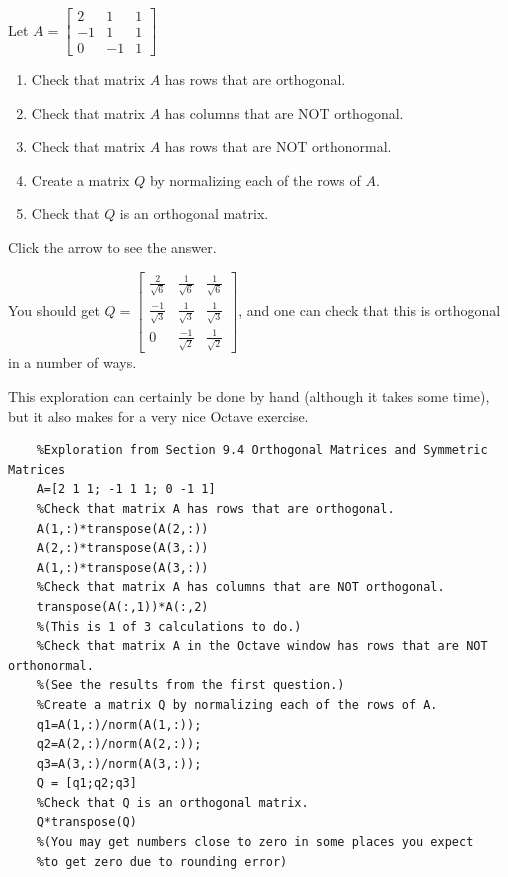 \documentclass{ximera}
\begin{document}

\begin{exploration}\label{exp:make_orthogonal}
Let $A=\begin{bmatrix}
    2&1&1\\-1&1&1\\0&-1&1
\end{bmatrix}$
\begin{enumerate}
    \item Check that matrix $A$ has rows that are orthogonal.
    \item Check that matrix $A$ has columns that are NOT orthogonal.
    \item Check that matrix $A$ has rows that are NOT orthonormal.
    \item Create a matrix $Q$ by normalizing each of the rows of $A$.
    \item Check that $Q$ is an orthogonal matrix.
\end{enumerate}

Click the arrow to see the answer.
\begin{expandable}{}{}
You should get $Q = \begin{bmatrix}
\frac{2}{\sqrt{6}} & \frac{1}{\sqrt{6}} & \frac{1}{\sqrt{6}} \\
\frac{-1}{\sqrt{3}} & \frac{1}{\sqrt{3}} & \frac{1}{\sqrt{3}} \\
0 & \frac{-1}{\sqrt{2}} & \frac{1}{\sqrt{2}}
\end{bmatrix}$, and one can check that this is orthogonal in a number of ways.
\end{expandable}

This exploration can certainly be done by hand (although it takes some time), but it also makes for a very nice Octave exercise.

\begin{verbatim}
    %Exploration from Section 9.4 Orthogonal Matrices and Symmetric Matrices
    A=[2 1 1; -1 1 1; 0 -1 1]
    %Check that matrix A has rows that are orthogonal.
    A(1,:)*transpose(A(2,:)) 
    A(2,:)*transpose(A(3,:)) 
    A(1,:)*transpose(A(3,:)) 
    %Check that matrix A has columns that are NOT orthogonal.
    transpose(A(:,1))*A(:,2) 
    %(This is 1 of 3 calculations to do.)
    %Check that matrix A in the Octave window has rows that are NOT orthonormal.
    %(See the results from the first question.)
    %Create a matrix Q by normalizing each of the rows of A.
    q1=A(1,:)/norm(A(1,:)); 
    q2=A(2,:)/norm(A(2,:));
    q3=A(3,:)/norm(A(3,:));
    Q = [q1;q2;q3]
    %Check that Q is an orthogonal matrix.
    Q*transpose(Q)
    %(You may get numbers close to zero in some places you expect 
    %to get zero due to rounding error)
\end{verbatim}


\end{exploration}
\end{document}
